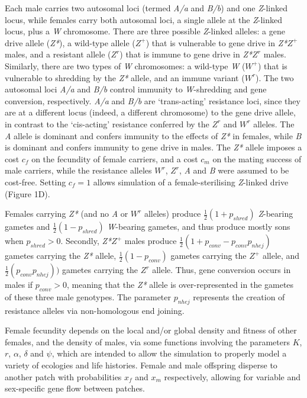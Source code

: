 \documentclass[]{rsos}%
\begin{document}
Each male carries two autosomal loci (termed \emph{A/a} and \emph{B/b})
and one \emph{Z}-linked locus, while females carry both autosomal loci,
a single allele at the \emph{Z}-linked locus, plus a \emph{W}
chromosome. There are three possible \emph{Z}-linked alleles: a gene
drive allele (\emph{Z*}), a wild-type allele (\(Z^+\)) that is
vulnerable to gene drive in \emph{Z*}\(Z^+\) males, and a resistant
allele (\(Z^r\)) that is immune to gene drive in \emph{Z*}\(Z^r\) males.
Similarly, there are two types of \emph{W} chromosomes: a wild-type
\emph{W} (\(W^+\)) that is vulnerable to shredding by the \emph{Z*}
allele, and an immune variant (\(W^r\)). The two autosomal loci
\emph{A/a} and \emph{B/b} control immunity to \emph{W}-shredding and
gene conversion, respectively. \emph{A/a} and \emph{B/b} are
`trans-acting' resistance loci, since they are at a different locus
(indeed, a different chromosome) to the gene drive allele, in contrast
to the `cis-acting' resistance conferred by the \(Z^r\) and \(W^r\)
alleles. The \emph{A} allele is dominant and confers immunity to the
effects of \emph{Z*} in females, while \emph{B} is dominant and confers
immunity to gene drive in males. The \emph{Z*} allele imposes a cost
\(c_f\) on the fecundity of female carriers, and a cost \(c_m\) on the
mating success of male carriers, while the resistance alleles \(W^r\),
\(Z^r\), \emph{A} and \emph{B} were assumed to be cost-free. Setting
\(c_f = 1\) allows simulation of a female-sterilising \emph{Z}-linked
drive (Figure 1D).

Females carrying \emph{Z*} (and no \emph{A} or \(W^r\) alleles) produce
\(\frac{1}{2}(1 + p_{shred})\) \emph{Z}-bearing gametes and
\(\frac{1}{2}(1 - p_{shred})\) \emph{W}-bearing gametes, and thus
produce mostly sons when \(p_{shred} > 0\). Secondly, \emph{Z*}\(Z^+\)
males produce \(\frac{1}{2}(1 + p_{conv} - p_{conv} p_{nhej})\) gametes
carrying the \emph{Z*} allele, \(\frac{1}{2}(1 - p_{conv})\) gametes
carrying the \(Z^+\) allele, and \(\frac{1}{2}(p_{conv} p_{nhej}))\)
gametes carrying the \(Z^r\) allele. Thus, gene conversion occurs in
males if \(p_{conv} > 0\), meaning that the \emph{Z*} allele is
over-represented in the gametes of these three male genotypes. The
parameter \(p_{nhej}\) represents the creation of resistance alleles via
non-homologous end joining.

Female fecundity depends on the local and/or global density and fitness
of other females, and the density of males, via some functions involving
the parameters \(K\), \(r\), \(\alpha\), \(\delta\) and \(\psi\), which
are intended to allow the simulation to properly model a variety of
ecologies and life histories. Female and male offspring disperse to
another patch with probabilities \(x_f\) and \(x_m\) respectively,
allowing for variable and sex-specific gene flow between patches.
\end{document}
